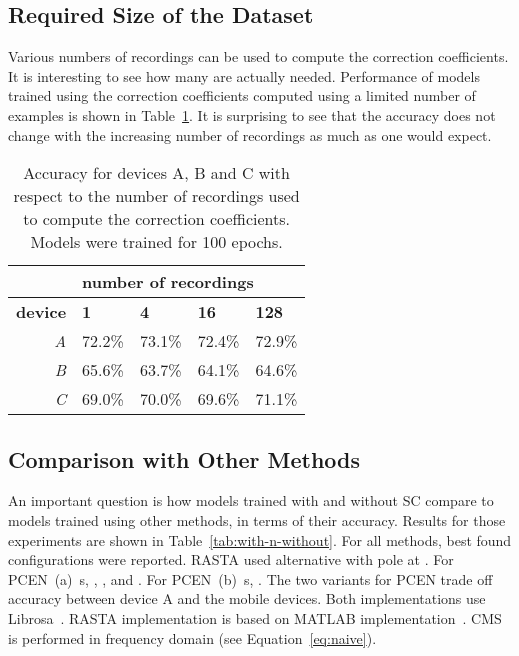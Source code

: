 \documentclass[a4paper]{article}
\begin{document}
\subsection{Required Size of the Dataset}
\label{ssec:num-examples}

Various numbers of recordings can be used to compute the correction coefficients. It is interesting to see how many are actually needed. Performance of models trained using the correction coefficients computed using a limited number of examples is shown in Table~\ref{tab:accuracy-num-examples}. It is surprising to see that the accuracy does not change with the increasing number of recordings as much as one would expect.

\begin{table}[htb]
\centering
\caption{Accuracy for devices A, B and C with respect to the number of recordings used to compute the correction coefficients. Models were trained for 100 epochs.}
\begin{tabular}{@{}r|llll@{}}
\toprule
                & \multicolumn{4}{l}{\textbf{number of recordings}}         \\ \midrule
\textbf{device} & \textbf{1} & \textbf{4} & \textbf{16} & \textbf{128} \\ \midrule
\textit{A}      & 72.2\%     & 73.1\%     & 72.4\%      & 72.9\%       \\
\textit{B}      & 65.6\%     & 63.7\%     & 64.1\%      & 64.6\%       \\
\textit{C}      & 69.0\%     & 70.0\%     & 69.6\%      & 71.1\%       \\ \bottomrule
\end{tabular}
\label{tab:accuracy-num-examples}
\end{table}

\subsection{Comparison with Other Methods}
\label{ssec:with-n-without}

An important question is how models trained with and without SC compare to models trained using other methods, in terms of their accuracy. Results for those experiments are shown in Table~\ref{tab:with-n-without}.
For all methods, best found configurations were reported. 
RASTA used alternative with pole at .
For PCEN~(a) \,s, , ,  and .
For PCEN~(b) \,s, . The two variants for PCEN trade off accuracy between device A and the mobile devices.
Both implementations use Librosa~\cite{mcfeeLibrosaAudioMusic2015}. RASTA implementation is based on MATLAB implementation~\cite{ellisPLPRASTAMFCC2005}. CMS is performed in frequency domain (see Equation~\eqref{eq:naive}). 
\end{document}
